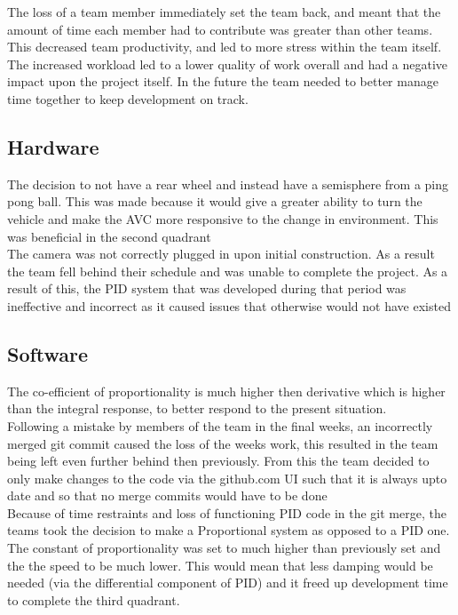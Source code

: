 \documentclass[paper=a4, fontsize=11pt]{scrartcl} %
\numberwithin{equation}{section} %
\numberwithin{figure}{section} %
\begin{document}
The loss of a team member immediately set the team back, and meant that the
amount of time each member had to contribute was greater than other teams. This
decreased team productivity, and led to more stress within the team itself. The
increased workload led to a lower quality of work overall and had a negative
impact upon the project itself. In the future the team needed to better manage
time together to keep development on track.\\

\subsection{Hardware}
The decision to not have a rear wheel and instead have a semisphere from a ping
pong ball. This was made because it would give a greater ability to turn the
vehicle and make the AVC more responsive to the change in environment. This was
beneficial in the second quadrant\\

The camera was not correctly plugged in upon initial construction.  As a result
the team fell behind their schedule and was unable to complete the project. 
As a result of this, the PID system that was developed during that period was
ineffective and incorrect as it caused issues that otherwise would not have
existed\\

\subsection{Software}
The co-efficient of proportionality is much higher then derivative which is
higher than the integral response, to better respond to the present situation.\\
Following a mistake by members of the team in the final weeks, an incorrectly
merged git commit caused the loss of the weeks work, this resulted in the team
being left even further behind then previously. From this the team decided to
only make changes to the code via the github.com UI such that it is always upto
date and so that no merge commits would have to be done\\

Because of time restraints and loss of functioning PID code in the git merge,
the teams took the decision to make a Proportional system as opposed to a PID
one. The constant of proportionality was set to much higher than previously set
and the the speed to be much lower. This would mean that less damping would be
needed (via the differential component of PID) and it freed up development time
to complete the third quadrant.\\
\end{document}
